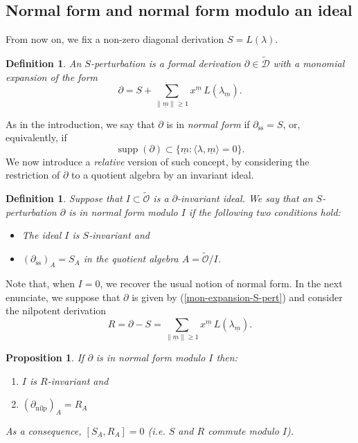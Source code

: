 \documentclass[10pt,twoside,reqno]{amsart}
\newtheorem{definition}[thm]{Definition}
\newtheorem{proposition}[thm]{Proposition}
\theoremstyle{remark}
\theoremstyle{remark}
\newcommand{\um}{{\underline m}}
\newcommand{\supp}{\operatorname{supp}}
\newcommand{\tmem}[1]{{\em #1\/}}
\newcommand{\tmop}[1]{{\operatorname{#1}}}
\newenvironment{itemizedot}{\begin{itemize} \renewcommand{\labelitemi}{$\bullet$}\renewcommand{\labelitemii}{$\bullet$}\renewcommand{\labelitemiii}{$\bullet$}\renewcommand{\labelitemiv}{$\bullet$}}{\end{itemize}}
\newcommand{\tO}{\widetilde{\mathcal{O}}}
\newcommand{\cD}{\mathcal{D}}
\newcommand{\tcD}{\widetilde{\cD}}
\newcommand{\vO}{\mathcal{O}}
\begin{document}
\subsection{Normal form and normal form modulo an ideal}\label{subsect-normalformsdef}
From now on, we fix a non-zero diagonal derivation $S=L(\lambda)$.
\begin{definition}\label{def-S-perturb}
An \tmem{$S$-perturbation} is a formal derivation
$\partial \in \tcD$ with a monomial expansion of the form
\begin{equation}\label{mon-expansion-S-pert}
  \partial = S + \sum_{\|\um\| \ge 1} x^{\um} \, L(\lambda_{\um}).
\end{equation}
\end{definition}
As in the introduction, we say that $\partial$ is in {\tmem{normal form}} if 
$\partial_{\tmop{ss}}=S$, or, equivalently, if $$\supp(\partial) \subset \{\um : \langle \lambda, \um \rangle = 0\}.$$ 
We now introduce a {\em relative} version of such concept, by considering the restriction of $\partial$ to a quotient algebra by an invariant ideal. 
\begin{definition}\label{def-nf-invideal}
Suppose that $I \subset \widetilde{\vO}$ is a
$\partial$-invariant ideal. We say that an $S$-perturbation $\partial$ is in {\tmem{normal form
modulo $I$}} if the following two conditions hold:
\begin{itemizedot}
  \item The ideal $I$ is $S$-invariant and
  \item $(\partial_{\tmop{ss}})_A = S_A$ in the quotient algebra $A = \tO /
  I$.
\end{itemizedot}
\end{definition}
Note that, when $I=0$, we recover the usual notion of normal form. In the next enunciate, we suppose that $\partial$ is given by (\ref{mon-expansion-S-pert}) and consider the nilpotent derivation 
$$R = \partial - S = \sum_{\|\um\| \ge 1} x^{\um} \, L(\lambda_{\um}).
$$
\begin{proposition}\label{prop:normalform-SR-invariant}
  If $\partial$ is in normal form modulo $I$ then:
  \begin{enumerate}
    \item $I$ is $R$-invariant and
    
    \item $(\partial_{\tmop{nilp}}) _A = R_A$
  \end{enumerate}
  As a consequence, $[S_A, R_A] = 0$ (i.e. $S$ and $R$ commute modulo $I$). 
\end{proposition}
\end{document}
